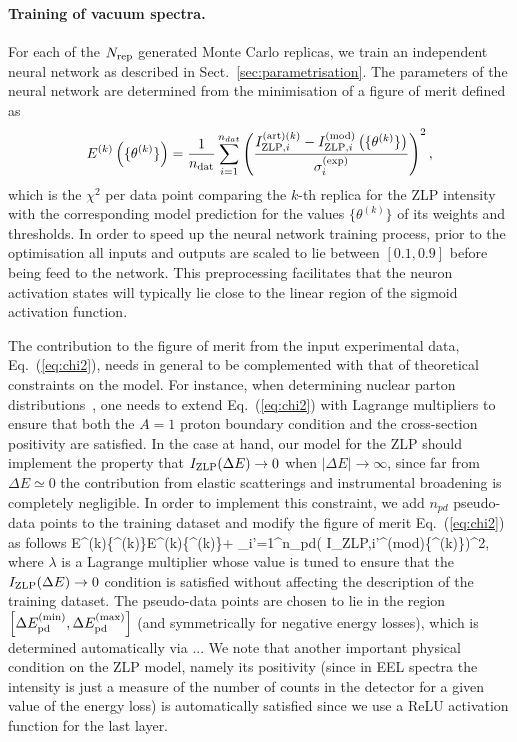 \paragraph{Training of vacuum spectra.}
%
For each of the $N_{\rm rep}$ generated Monte Carlo replicas, we train an independent
neural network as described in Sect.~\ref{sec:parametrisation}.
%
The parameters of the neural network are determined from the minimisation of a figure of merit
defined as
\begin{equation}
  \label{eq:chi2}
\begin{centering}
  E^{(k)}\lp \{\theta^{(k)}\}\rp = \frac{1}{n_{\rm dat}}\sum_{i=1}^{n_{dat}}\left(\frac{ I_{{\rm ZLP},i}^{{\rm (art)}(k)} -
  I_{{\rm ZLP},i}^{{\rm (mod)}}\lp \{\theta^{(k)}\}\rp }{\sigma_i^{(\rm exp)}}\right)^2, 
\end{centering}
\end{equation}
which is the $\chi^2$ per data point comparing the $k$-th replica for the ZLP
intensity with the corresponding model prediction for the values
$\{\theta^{(k)}\}$ of its weights and thresholds.
%
In order to speed up the neural network training process, prior to the optimisation
all inputs and outputs are scaled to lie between $[0.1, 0.9]$ before
being feed to the network.
%
This preprocessing facilitates that
 the neuron activation states will typically
lie close to the linear region of the sigmoid activation function.

The contribution to the figure of merit from the input experimental data, Eq.~(\ref{eq:chi2}),
needs in general to be complemented with that of theoretical constraints on the model.
%
For instance, when determining nuclear parton distributions~\cite{AbdulKhalek:2020yuc}, one needs to
extend Eq.~(\ref{eq:chi2}) with Lagrange multipliers to ensure that both the $A=1$ proton boundary
condition and the cross-section positivity are satisfied.
%
In the case at hand, our model for the ZLP should implement the property that $I_{\rm ZLP}(\Delta E)\to 0$
when $|\Delta E| \to \infty$, since far from $\Delta E\simeq 0$ the contribution from elastic scatterings
and instrumental broadening is completely negligible.
%
In order to implement this constraint, we add $n_{pd}$ pseudo-data points to the training dataset and modify
the figure of merit Eq.~(\ref{eq:chi2}) as follows
\be
\label{eq:chi2modified}
E^{(k)}\lp \{\theta^{(k)}\}\rp \to E^{(k)}\lp \{\theta^{(k)}\}\rp +
\lambda \sum_{i'=1}^{n_{pd}}\left(
  I_{{\rm ZLP},i'}^{{\rm (mod)}}\lp \{\theta^{(k)}\}\rp \right)^2, 
  \ee
  where $\lambda$ is a Lagrange multiplier whose value is tuned to ensure that the $I_{\rm ZLP}(\Delta E)\to 0$
  condition
  is satisfied without affecting the description of the training dataset.
  The pseudo-data points are chosen to lie in the region $\left[ \Delta E_{\rm pd}^{\rm (min)},
  \Delta E_{\rm pd}^{\rm (max)}\right]$ (and symmetrically for negative energy losses),
  which is determined automatically via ...
We note that another important physical condition on the ZLP model, namely its positivity
(since in EEL spectra the intensity is just a measure of the number of counts in the
detector for a given value of the energy loss) is automatically satisfied since
we use a ReLU activation function for the last layer.

